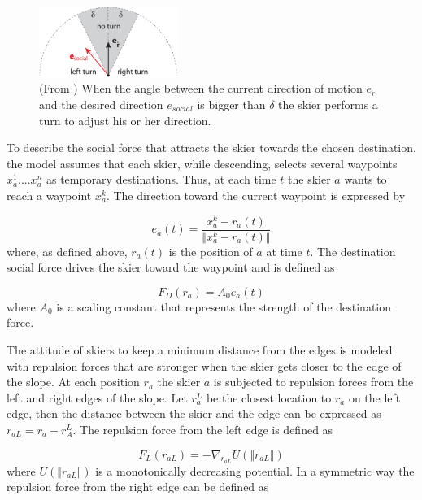 \documentclass[12pt,a4paper,twoside]{book}
\begin{document}
\begin{figure}
  \begin{center}
    \includegraphics[width=0.4\textwidth]{images/start_turn_pic.eps}
    \caption{(From \cite{hol2012}) When the angle between the current direction of motion $e_{\dot{r}}$ and the desired direction $e_{social}$ is bigger than $\delta$ the skier performs a turn to adjust his or her direction.}\label{start_turn_pic}
  \end{center}
\end{figure}

To describe the social force that attracts the skier towards the chosen destination, the model assumes that each skier, while descending, selects several waypoints $x_a^1....x_a^n$ as temporary destinations. Thus, at each time $t$ the skier $a$ wants to reach a waypoint $x_a^k$. The direction toward the current waypoint is expressed by

\begin{equation}\label{waypoint_direction}
e_a(t)=\frac{x^k_a-r_a(t)}{\Vert x^k_a-r_a(t) \Vert}
\end{equation}
where, as defined above, $r_a(t)$ is the position of $a$ at time $t$. The destination social force drives the skier toward the waypoint and is defined as

\begin{equation}\label{destination_force}
F_D(r_a)=A_0 e_a(t)
\end{equation}
where $A_0$ is a scaling constant that represents the strength of the destination force.

The attitude of skiers to keep a minimum distance from the edges is modeled with repulsion forces that are stronger when the skier gets closer to the edge of the slope. At each position $r_a$ the skier $a$ is subjected to repulsion forces from the left and right edges of the slope. Let $r_a^L$ be the closest location to $r_a$ on the left edge, then the distance between the skier and the edge can be expressed as $r_{aL}=r_a-r_A^L$. The repulsion force from the left edge is defined as

\begin{equation}\label{left_force}
F_L(r_{aL})=-\nabla_{r_{aL}}U(\Vert r_{aL} \Vert )
\end{equation}
where $U(\Vert r_{aL} \Vert )$ is a monotonically decreasing potential. In a symmetric way the repulsion force from the right edge can be defined as
\end{document}
